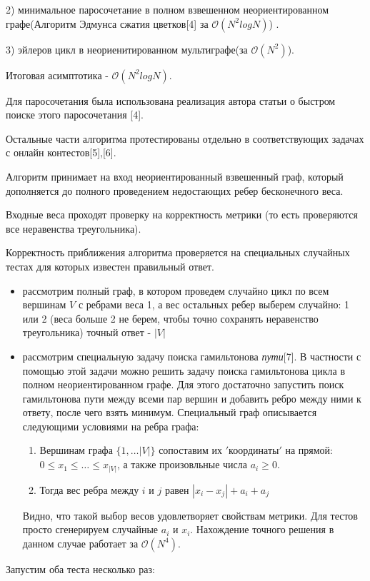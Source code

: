 \documentclass[14pt]{article}
\begin{document}
     2) минимальное паросочетание в полном взвешенном неориентированном графе(Алгоритм Эдмунса сжатия цветков[4] за  $\mathcal{O}(N^2logN)$) .

     3) эйлеров цикл в неориенитированном мультиграфе(за $\mathcal{O}(N^2)$).

     Итоговая асимптотика - $\mathcal{O}(N^2logN)$.

     Для паросочетания была использована реализация автора статьи о быстром поиске этого паросочетания [4].

     Остальные части алгоритма протестированы отдельно в соответствующих задачах с онлайн контестов[5],[6].

     Алгоритм принимает на вход неориентированный взвешенный граф,  который дополняется до полного проведением недостающих ребер бесконечного веса.

     Входные веса проходят проверку на корректность метрики (то есть проверяются все неравенства треугольника).

     \newpage
     Корректность приближения алгоритма проверяется на специальных случайных тестах для которых известен правильный ответ.

     \begin{itemize}
     \item рассмотрим полный граф, в котором проведем случайно цикл по всем вершинам $V$ с ребрами веса 1, а вес остальных ребер выберем случайно: 1 или 2 (веса больше 2 не берем, чтобы точно сохранять неравенство треугольника)
    точный ответ - $|V|$

     \item рассмотрим специальную задачу поиска гамильтонова \textit{пути}[7].
     В частности с помощью этой задачи можно решить задачу поиска гамильтонова цикла в полном неориентированном графе. Для этого достаточно запустить поиск гамильтонова пути между всеми пар вершин и добавить ребро между ними к ответу, после чего взять минимум. Специальный граф описывается следующими условиями на ребра графа:
     \begin{enumerate}
     \item Вершинам графа $\{1,\dots|V|\}$ сопоставим их $'$координаты$'$ на прямой: $0 \leq x_1 \leq \dots \leq x_{|V|}$, 
     а также произовльные числа $a_i \geq 0$.
     \item Тогда вес ребра между $i$ и $j$ равен $|x_i - x_j| + a_i + a_j$
     \end{enumerate}
     Видно, что такой выбор весов удовлетворяет свойствам метрики.
     Для тестов просто сгенерируем случайные $a_i$ и $x_i$. Нахождение точного решения в данном случае работает за $\mathcal{O}(N^4)$.
     \end{itemize}
     Запустим оба теста несколько раз:
\end{document}
